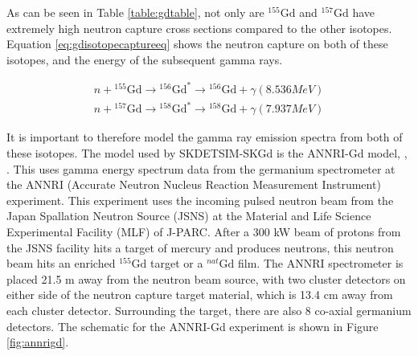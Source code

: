 As can be seen in Table \ref{table:gdtable}, not only are ${ }^{155} \mathrm{Gd}$ and ${ }^{157} \mathrm{Gd}$ have extremely high neutron capture cross sections compared to the other isotopes. Equation \ref{eq:gdisotopecaptureeq} shows the neutron capture on both of these isotopes, and the energy of the subsequent gamma rays.

\begin{equation}
\begin{split}
 {n}+{ }^{155} \mathrm{Gd} \rightarrow{ }^{156} \mathrm{Gd}^{*} \rightarrow{ }^{156} \mathrm{Gd}+\gamma  (8.536 MeV)\\
 {n}+{ }^{157} \mathrm{Gd} \rightarrow{ }^{158} \mathrm{Gd}^{*} \rightarrow{ }^{158} \mathrm{Gd}+\gamma  (7.937 MeV)
\end{split}
\label{eq:gdisotopecaptureeq}    
\end{equation}




It is important to therefore model the gamma ray emission spectra from both of these isotopes. The model used by SKDETSIM-SKGd is the ANNRI-Gd model, \cite{annri_gd_energy}, \cite{tanaka_gamma_2020}. This uses gamma energy spectrum data from the germanium spectrometer at the ANNRI (Accurate Neutron Nucleus Reaction Measurement Instrument) experiment. This experiment uses the incoming pulsed neutron beam from the Japan Spallation Neutron Source (JSNS) at the Material and Life Science Experimental Facility (MLF) of J-PARC. After a 300 kW beam of protons from the JSNS facility hits a target of mercury and produces neutrons, this neutron beam hits an enriched ${ }^{155} \mathrm{Gd}$ target or a ${ }^{nat} \mathrm{Gd}$ film. The ANNRI spectrometer is placed 21.5 m away from the neutron beam source, with two cluster detectors on either side of the neutron capture target material, which is 13.4 cm away from each cluster detector. Surrounding the target, there are also 8 co-axial germanium detectors. The schematic for the ANNRI-Gd experiment is shown in Figure \ref{fig:annrigd}.

